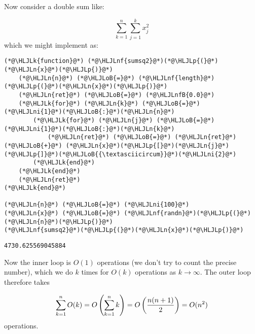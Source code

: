 \documentclass[12pt,a4paper]{article}
\newcommand{\HLJLk}[1]{\textcolor[RGB]{148,91,176}{\textbf{#1}}}
\newcommand{\HLJLn}[1]{#1}
\newcommand{\HLJLnf}[1]{\textcolor[RGB]{66,102,213}{#1}}
\newcommand{\HLJLnfB}[1]{\textcolor[RGB]{59,151,46}{#1}}
\newcommand{\HLJLni}[1]{\textcolor[RGB]{59,151,46}{#1}}
\newcommand{\HLJLoB}[1]{\textcolor[RGB]{102,102,102}{\textbf{#1}}}
\newcommand{\HLJLp}[1]{#1}
\begin{document}
Now consider a double sum like:

\[
\sum_{k=1}^n \sum_{j=1}^k x_j^2
\]
which we might implement as:


\begin{lstlisting}
(*@\HLJLk{function}@*) (*@\HLJLnf{sumsq2}@*)(*@\HLJLp{(}@*)(*@\HLJLn{x}@*)(*@\HLJLp{)}@*)
    (*@\HLJLn{n}@*) (*@\HLJLoB{=}@*) (*@\HLJLnf{length}@*)(*@\HLJLp{(}@*)(*@\HLJLn{x}@*)(*@\HLJLp{)}@*)
    (*@\HLJLn{ret}@*) (*@\HLJLoB{=}@*) (*@\HLJLnfB{0.0}@*)
    (*@\HLJLk{for}@*) (*@\HLJLn{k}@*) (*@\HLJLoB{=}@*) (*@\HLJLni{1}@*)(*@\HLJLoB{:}@*)(*@\HLJLn{n}@*)
        (*@\HLJLk{for}@*) (*@\HLJLn{j}@*) (*@\HLJLoB{=}@*) (*@\HLJLni{1}@*)(*@\HLJLoB{:}@*)(*@\HLJLn{k}@*)
            (*@\HLJLn{ret}@*) (*@\HLJLoB{=}@*) (*@\HLJLn{ret}@*) (*@\HLJLoB{+}@*) (*@\HLJLn{x}@*)(*@\HLJLp{[}@*)(*@\HLJLn{j}@*)(*@\HLJLp{]}@*)(*@\HLJLoB{{\textasciicircum}}@*)(*@\HLJLni{2}@*)
        (*@\HLJLk{end}@*)
    (*@\HLJLk{end}@*)
    (*@\HLJLn{ret}@*)
(*@\HLJLk{end}@*)

(*@\HLJLn{n}@*) (*@\HLJLoB{=}@*) (*@\HLJLni{100}@*)
(*@\HLJLn{x}@*) (*@\HLJLoB{=}@*) (*@\HLJLnf{randn}@*)(*@\HLJLp{(}@*)(*@\HLJLn{n}@*)(*@\HLJLp{)}@*)
(*@\HLJLnf{sumsq2}@*)(*@\HLJLp{(}@*)(*@\HLJLn{x}@*)(*@\HLJLp{)}@*)
\end{lstlisting}

\begin{lstlisting}
4730.625569045884
\end{lstlisting}


Now the inner loop is $O(1)$ operations (we don't try to count the precise number), which we do $k$ times for $O(k)$ operations as $k \ensuremath{\rightarrow} \ensuremath{\infty}$. The outer loop therefore takes

\[
\ensuremath{\sum}_{k = 1}^n O(k) = O\left(\ensuremath{\sum}_{k = 1}^n k\right) = O\left( {n (n+1) \over 2} \right) = O(n^2)
\]
operations.
\end{document}
